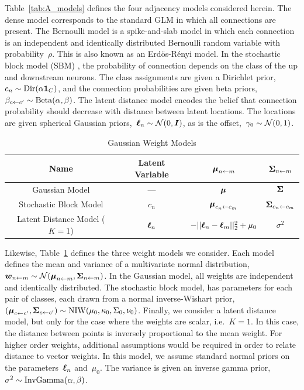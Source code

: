 Table~\ref{tab:A_models} defines the four adjacency models considered 
herein. The dense model corresponds to the standard GLM in which all
connections are present. The Bernoulli model is a spike-and-slab model 
in which each connection is an independent and identically distributed 
Bernoulli random variable with probability~$\rho$. This is also known 
as an Erd\"os-R\'enyi model. In the stochastic block model (SBM) 
\cite{Nowicki-2001}, the probability of connection depends on the class 
of the up and downstream neurons. The class assignments are given a 
Dirichlet prior,~${c_n \sim \mathrm{Dir}(\alpha \boldsymbol{1}_C)}$, and the 
connection probabilities are given beta 
priors,~${\beta_{c \leftarrow c'} \sim \mathrm{Beta}(\alpha, \beta)}$. 
The latent distance model \cite{Hoff-2008} encodes the belief that 
connection probability should decrease with distance between latent 
locations. The locations are given spherical Gaussian 
priors,~$\boldsymbol{\ell}_n \sim \mathcal{N}(0, \boldsymbol{I})$, as is the 
offset,~$\gamma_0 \sim \mathcal{N}(0, 1)$.


\begin{table}
\begin{center}
\begin{tabular}{c|c|c|c}
Name & Latent Variable & $\boldsymbol{\mu}_{n \leftarrow m}$ & $\boldsymbol{\Sigma}_{n \leftarrow m}$\\
\hline
Gaussian Model & --- & $\boldsymbol{\mu}$ & $\boldsymbol{\Sigma}$ \\
Stochastic Block Model & $c_n$ & $\boldsymbol{\mu}_{c_n \leftarrow c_m}$ & $\boldsymbol{\Sigma}_{c_n \leftarrow c_m}$ \\
Latent Distance Model (${K=1}$) & $\boldsymbol{\ell}_n$ & $-||\boldsymbol{\ell}_n - \boldsymbol{\ell}_m||_2^2 + \mu_0$ & $\sigma^2$
\end{tabular}
\end{center}
\caption{Gaussian Weight Models}
\label{tab:W_models}
\end{table}

Likewise, Table~\ref{tab:W_models} defines the three weight models we
consider.  Each model defines the mean and variance of a multivariate
normal distribution,~$\boldsymbol{w}_{n \leftarrow m} \sim \mathcal{N}(\boldsymbol{\mu}_{n \leftarrow
  m}, \boldsymbol{\Sigma}_{n \leftarrow m})$.  In the Gaussian model, all weights are
independent and identically distributed.  The stochastic block model,
has parameters for each pair of classes, each drawn from a normal
inverse-Wishart prior,~$(\boldsymbol{\mu}_{c \leftarrow c'}, \boldsymbol{\Sigma}_{c \leftarrow c'}) \sim
\mathrm{NIW}(\mu_0, \kappa_0, \Sigma_0, \nu_0)$. Finally, we
consider a latent distance model, but only for the case where the
weights are scalar, i.e.~$K=1$. In this case, the distance between
points is inversely proportional to the mean weight.  For higher order
weights, additional assumptions would be required in order to relate
distance to vector weights. In this model, we assume standard normal
priors on the parameters~$\boldsymbol{\ell}_n$ and~$\mu_0$.  The variance is given
an inverse gamma prior,~$\sigma^2 \sim \mathrm{InvGamma}(\alpha, \beta)$.

